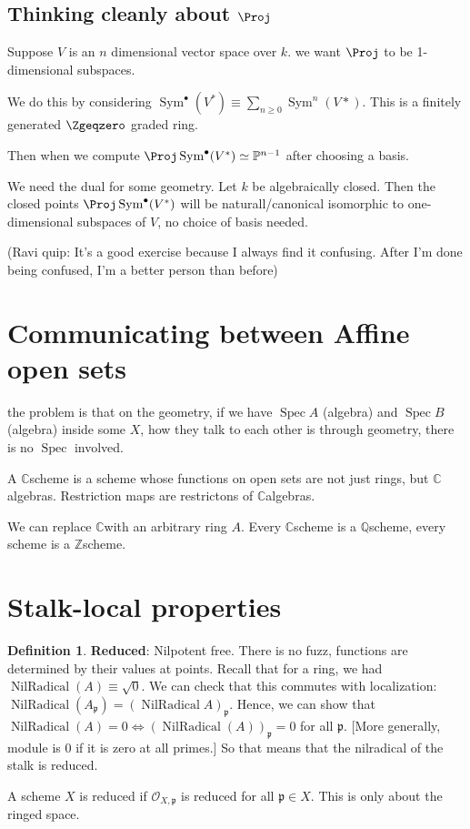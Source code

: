 \documentclass{book}
\newcommand{\Z}{\ensuremath{\mathbb{Z}}}
\newcommand{\Q}{\ensuremath{\mathbb{Q}}}
\newcommand{\C}{\ensuremath{\mathbb{C}}}
\renewcommand{\P}{\ensuremath{\mathbb{P}}}
\renewcommand{\O}{\ensuremath{\mathcal{O}}}
\newcommand{\Spec}{\operatorname{Spec}}
\newcommand{\p}{\mathfrak{p}}
\newcommand{\sym}{\operatorname{Sym}}
\newcommand{\Sym}{\sym}
\newcommand{\nil}{\operatorname{NilRadical}}
\theoremstyle{definition}
\newtheorem{definition}[theorem]{Definition}
\begin{document}
\subsection{Thinking cleanly about $\Proj$}

Suppose $V$ is an $n$ dimensional vector space over $k$. we want $\Proj$ 
to be 1-dimensional subspaces. 

We do this by considering $\Sym^\bullet(V^*) \equiv \sum_{n \geq 0} \Sym^n (V*)$.
This is a finitely generated $\Zgeqzero$ graded ring. 

Then when we compute $\Proj \Sym^\bullet(V^*) \simeq \P^{n-1}$ after choosing a basis.

We need the dual for some geometry. Let $k$ be algebraically closed.  Then
the closed points $\Proj \Sym^\bullet(V^*)$ will be naturall/canonical isomorphic
to one-dimensional subspaces of $V$, no choice of basis needed.

(Ravi quip: It's a good exercise because I always find it confusing. After I'm
done being confused, I'm a better person than before)

\section{Communicating between Affine open sets}

the problem is that on the geometry, if we have $\Spec A$ (algebra) and
$\Spec B$ (algebra) inside
some $X$, how they talk to each other is through geometry, there is no $\Spec$
involved.

\example{\C-schemes}
A \C scheme is a scheme whose functions on open sets are not just rings, but \C
algebras. Restriction maps are restrictons of \C algebras.


We can replace \C with an arbitrary ring $A$.
Every \C scheme is a \Q scheme, every scheme is a \Z scheme.

\section{Stalk-local properties} 

\begin{definition}
\textbf{Reduced}: Nilpotent free. There is no fuzz, functions are determined
by their values at points. Recall that for a ring, we had $\nil(A) \equiv \sqrt{0}$.
We can check that this commutes with localization: $\nil(A_\p) = (\nil A)_\p$. Hence,
we can show that $\nil(A) = 0 \iff (\nil(A))_\p = 0$ for all $\p$. [More generally,
module is $0$ if it is zero at all primes.] So that means that the nilradical
of the stalk is reduced.

A scheme $X$ is reduced if $\O_{X, \p}$ is reduced for all $\p \in X$. This is
only about the ringed space. 
\end{definition}
\end{document}
